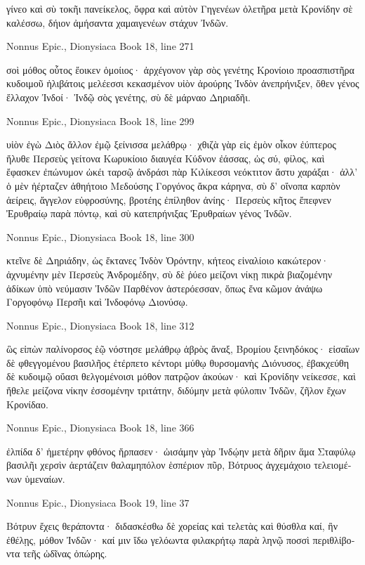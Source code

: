 \documentclass[12pt,letterpaper,twoside,final]{memoir}
\begin{document}
\begin{greek}
γίνεο καὶ σὺ τοκῆι πανείκελος, ὄφρα καὶ αὐτὸν 
Γηγενέων ὀλετῆρα μετὰ Κρονίδην σὲ καλέσσω, 
δήιον ἀμήσαντα χαμαιγενέων στάχυν Ἰνδῶν. 



Nonnus Epic., Dionysiaca 
Book 18, line 271

σοὶ μόθος οὗτος ἔοικεν ὁμοίιος· ἀρχέγονον γὰρ 
σὸς γενέτης Κρονίοιο προασπιστῆρα κυδοιμοῦ 
ἠλιβάτοις μελέεσσι κεκασμένον υἱὸν ἀρούρης   
Ἰνδὸν ἀνεπρήνιξεν, ὅθεν γένος ἔλλαχον Ἰνδοί· 
Ἰνδῷ σὸς γενέτης, σὺ δὲ μάρναο Δηριαδῆι. 



Nonnus Epic., Dionysiaca 
Book 18, line 299

υἱὸν ἐγὼ Διὸς ἄλλον ἐμῷ ξείνισσα μελάθρῳ·   
χθιζὰ γὰρ εἰς ἐμὸν οἶκον ἐύπτερος ἤλυθε Περσεὺς 
γείτονα Κωρυκίοιο διαυγέα Κύδνον ἐάσσας, 
ὡς σύ, φίλος, καὶ ἔφασκεν ἐπώνυμον ὠκέι ταρσῷ 
ἀνδράσι πὰρ Κιλίκεσσι νεόκτιτον ἄστυ χαράξαι· 
ἀλλ' ὁ μὲν ἠέρταζεν ἀθηήτοιο Μεδούσης 
Γοργόνος ἄκρα κάρηνα, σὺ δ' οἴνοπα καρπὸν ἀείρεις, 
ἄγγελον εὐφροσύνης, βροτέης ἐπίληθον ἀνίης· 
Περσεὺς κῆτος ἔπεφνεν Ἐρυθραίῳ παρὰ πόντῳ, 
καὶ σὺ κατεπρήνιξας Ἐρυθραίων γένος Ἰνδῶν. 



Nonnus Epic., Dionysiaca 
Book 18, line 300

κτεῖνε δὲ Δηριάδην, ὡς ἔκτανες Ἰνδὸν Ὀρόντην, 
κήτεος εἰναλίοιο κακώτερον· ἀχνυμένην μὲν 
Περσεὺς Ἀνδρομέδην, σὺ δὲ ῥύεο μείζονι νίκῃ 
πικρὰ βιαζομένην ἀδίκων ὑπὸ νεύμασιν Ἰνδῶν 
Παρθένον ἀστερόεσσαν, ὅπως ἕνα κῶμον ἀνάψω 
Γοργοφόνῳ Περσῆι καὶ Ἰνδοφόνῳ Διονύσῳ. 



Nonnus Epic., Dionysiaca 
Book 18, line 312

ὣς εἰπὼν παλίνορσος ἑῷ νόστησε μελάθρῳ 
ἁβρὸς ἄναξ, Βρομίου ξεινηδόκος· εἰσαΐων δὲ 
φθεγγομένου βασιλῆος ἐτέρπετο κέντορι μύθῳ 
θυρσομανὴς Διόνυσος, ἐβακχεύθη δὲ κυδοιμῷ 
οὔασι θελγομένοισι μόθον πατρῷον ἀκούων· 
καὶ Κρονίδην νείκεσσε, καὶ ἤθελε μείζονα νίκην   
ἐσσομένην τριτάτην, διδύμην μετὰ φύλοπιν Ἰνδῶν, 
ζῆλον ἔχων Κρονίδαο. 



Nonnus Epic., Dionysiaca 
Book 18, line 366

ἐλπίδα δ' ἡμετέρην φθόνος ἥρπασεν· ὠισάμην γὰρ 
Ἰνδῴην μετὰ δῆριν ἅμα Σταφύλῳ βασιλῆι 
χερσὶν ἀερτάζειν θαλαμηπόλον ἑσπέριον πῦρ, 
Βότρυος ἀγχεμάχοιο τελειομένων ὑμεναίων. 



Nonnus Epic., Dionysiaca 
Book 19, line 37

Βότρυν ἔχεις θεράποντα· διδασκέσθω δὲ χορείας 
καὶ τελετὰς καὶ θύσθλα καί, ἢν ἐθέλῃς, μόθον Ἰνδῶν·   
καί μιν ἴδω γελόωντα φιλακρήτῳ παρὰ ληνῷ 
ποσσὶ περιθλίβοντα τεῆς ὠδῖνας ὀπώρης. 




\end{greek}
\end{document}
